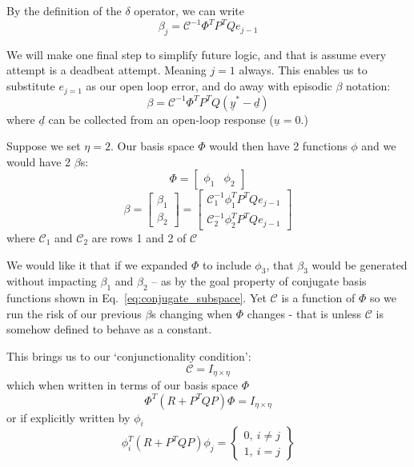 By the definition of the $\delta$ operator, we can write
\begin{equation}
    \beta_j = {\mathcal{C}}^{-1}\Phi^T P^T Q e_{j-1}
    \label{eq:beta_j_with_conjunct}
\end{equation}

We will make one final step to simplify future logic, and that is assume every attempt is a deadbeat attempt. Meaning $j=1$ always. This enables us to substitute $e_{j=1}$ as our open loop error, and do away with episodic $\beta$ notation:
\begin{equation}
    \beta = {\mathcal{C}}^{-1}\Phi^T P^T Q (\underline{y}^\ast - \underline{d})
    \label{eq:beta_j_with_conjunct_e_0}
\end{equation}
where $\underline{d}$ can be collected from an open-loop response ($\underline{u} = 0$.)


Suppose we set $\eta = 2$. Our basis space $\Phi$ would then have 2 functions $\phi$ and we would have 2 $\beta$s:
\begin{equation}
    \Phi = \begin{bmatrix}\phi_1 & \phi_2 \end{bmatrix}
\end{equation}
\begin{equation}
    \beta = 
    \begin{bmatrix}
        \beta_1 \\ \beta_2
    \end{bmatrix}
    =
    \begin{bmatrix}
        \mathcal{C}_1^{-1} \phi_1^T P^T Q e_{j-1} \\
        \mathcal{C}_2^{-1}\phi_2^T P^T Q e_{j-1}
    \end{bmatrix}
\end{equation}
where $\mathcal{C}_1$ and $\mathcal{C}_2$ are rows 1 and 2 of $\mathcal{C}$

We would like it that if we expanded $\Phi$ to include $\phi_3$, that $\beta_3$ would be generated without impacting $\beta_1$ and $\beta_2$ -- as by the goal property of conjugate basis functions shown in Eq.~\ref{eq:conjugate_subspace}. Yet $\mathcal{C}$ is a function of $\Phi$ so we run the risk of our previous $\beta$s changing when $\Phi$ changes - that is unless $\mathcal{C}$ is somehow defined to behave as a constant.

This brings us to our `conjunctionality condition':
\begin{equation}
    \mathcal{C} = I_{\eta \times \eta}
\end{equation}
which when written in terms of our basis space $\Phi$
\begin{equation}
    \Phi^T \left(R + P^T QP\right) \Phi = I_{\eta \times \eta}
    \label{eq:conjuct_cond_I}
\end{equation}
or if explicitly written by $\phi_i$
\begin{equation}
    \phi_i^T \left(R + P^T QP\right) \phi_j =
    \begin{Bmatrix}
        0,\ i \neq j \\
        1,\ i = j
    \end{Bmatrix}
\end{equation}

